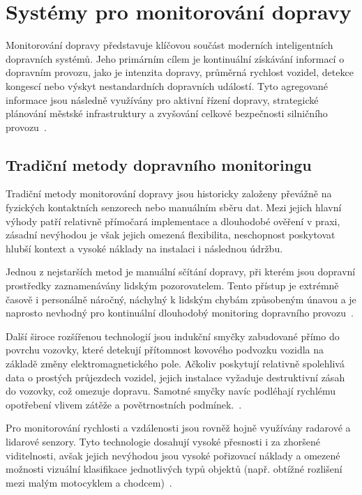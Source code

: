 \documentclass[male,czech,api_bc]{kitheses}
\begin{document}
\section{Systémy pro monitorování dopravy}
Monitorování dopravy představuje klíčovou součást moderních inteligentních dopravních systémů. Jeho primárním cílem je kontinuální získávání informací o dopravním provozu, jako je intenzita dopravy, průměrná rychlost vozidel, detekce kongescí nebo výskyt nestandardních dopravních událostí. Tyto agregované informace jsou následně využívány pro aktivní řízení dopravy, strategické plánování městské infrastruktury a zvyšování celkové bezpečnosti silničního provozu~\cite{zhou_traffic_survey_2024}.

\subsection{Tradiční metody dopravního monitoringu}
Tradiční metody monitorování dopravy jsou historicky založeny převážně na fyzických kontaktních senzorech nebo manuálním sběru dat. Mezi jejich hlavní výhody patří relativně přímočará implementace a dlouhodobé ověření v praxi, zásadní nevýhodou je však jejich omezená flexibilita, neschopnost poskytovat hlubší kontext a vysoké náklady na instalaci i následnou údržbu.

Jednou z nejstarších metod je manuální sčítání dopravy, při kterém jsou dopravní prostředky zaznamenávány lidským pozorovatelem. Tento přístup je extrémně časově i personálně náročný, náchylný k lidským chybám způsobeným únavou a je naprosto nevhodný pro kontinuální dlouhodobý monitoring dopravního provozu~\cite{zhou_traffic_survey_2024}.

Další široce rozšířenou technologií jsou indukční smyčky zabudované přímo do povrchu vozovky, které detekují přítomnost kovového podvozku vozidla na základě změny elektromagnetického pole. Ačkoliv poskytují relativně spolehlivá data o prostých průjezdech vozidel, jejich instalace vyžaduje destruktivní zásah do vozovky, což omezuje dopravu. Samotné smyčky navíc podléhají rychlému opotřebení vlivem zátěže a povětrnostních podmínek.~\cite{zhou_traffic_survey_2024}.

Pro monitorování rychlosti a vzdálenosti jsou rovněž hojně využívány radarové a lidarové senzory. Tyto technologie dosahují vysoké přesnosti i za zhoršené viditelnosti, avšak jejich nevýhodou jsou vysoké pořizovací náklady a omezené možnosti vizuální klasifikace jednotlivých typů objektů (např. obtížné rozlišení mezi malým motocyklem a chodcem)~\cite{zhou_traffic_survey_2024}.
\end{document}
